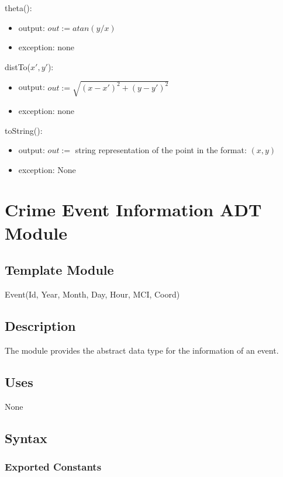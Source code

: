 \documentclass[12pt]{article}
\begin{document}
\noindent theta():
\begin{itemize}
\item output: $out := atan(y/x)$
\item exception: none
\end{itemize}


\noindent distTo($x', y'$):
\begin{itemize}
\item output: $out := \sqrt{(x - x')^2 + (y - y')^2}$
\item exception: none
\end{itemize}


\noindent toString():
\begin{itemize}
\item output: $out := $ string representation of the point in the format: $(x, y)$
\item exception: None
\end{itemize}


\newpage

\section* {Crime Event Information ADT Module}

\subsection*{Template Module}

Event(Id, Year, Month, Day, Hour, MCI, Coord)

\subsection*{Description}
The module provides the abstract data type for the information of an event. 

\subsection* {Uses}

None

\subsection* {Syntax}

\subsubsection* {Exported Constants}
\end{document}
